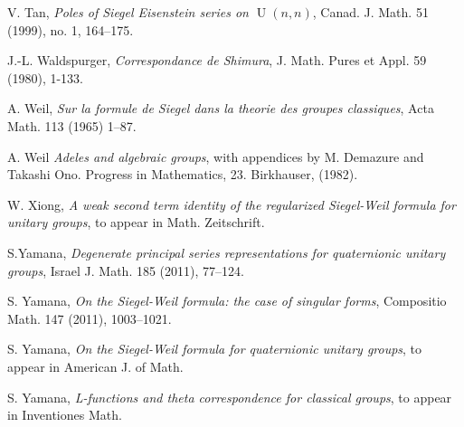 \documentclass[10pt]{amsart}
\theoremstyle{plain}
\numberwithin{equation}{section}
\begin{document}
\begin{thebibliography}{99}
 V. Tan, {\em Poles of Siegel Eisenstein series on
    ${\operatorname{U}}(n,n)$}, Canad. J. Math. 51 (1999), no. 1, 164--175.

 J.-L. Waldspurger, {\em Correspondance de Shimura},
  J. Math. Pures et Appl. 59 (1980), 1-133.
 
 A. Weil, {\it Sur la formule de Siegel dans la
    theorie des groupes classiques}, Acta Math. 113 (1965) 1--87.

 A. Weil {\it Adeles and algebraic groups}, with
  appendices by M. Demazure and
Takashi Ono. Progress in Mathematics, 23. Birkhauser, (1982).

 W. Xiong, {\em A weak second term identity of the
    regularized Siegel-Weil formula for unitary groups}, to appear in Math. Zeitschrift.

S.Yamana,
\emph{Degenerate principal series representations for quaternionic unitary groups},
 Israel J. Math. 185 (2011), 77--124.

 S. Yamana, {\em On the Siegel-Weil formula: the case
    of singular forms}, Compositio Math. 147 (2011), 1003--1021.

 S. Yamana, {\em On the Siegel-Weil formula for
    quaternionic unitary groups}, to appear in American J. of Math.

 S. Yamana, {\em L-functions and theta correspondence
    for classical groups}, to appear in Inventiones Math.

\end{thebibliography}
\end{document}
